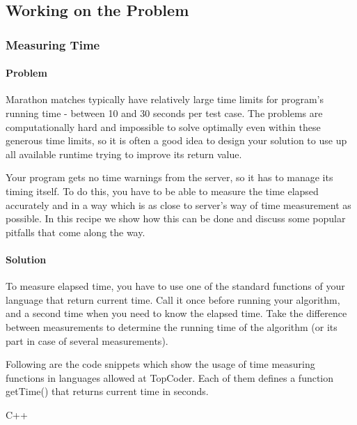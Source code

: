 \hypertarget{working-on-the-problem}{%
\subsection{Working on the Problem}\label{working-on-the-problem}}

\hypertarget{measuring-time}{%
\subsubsection{Measuring Time}\label{measuring-time}}

\hypertarget{problem}{%
\paragraph{Problem}\label{problem}}

Marathon matches typically have relatively large time limits for
program's running time - between 10 and 30 seconds per test case. The
problems are computationally hard and impossible to solve optimally even
within these generous time limits, so it is often a good idea to design
your solution to use up all available runtime trying to improve its
return value.

Your program gets no time warnings from the server, so it has to manage
its timing itself. To do this, you have to be able to measure the time
elapsed accurately and in a way which is as close to server's way of
time measurement as possible. In this recipe we show how this can be
done and discuss some popular pitfalls that come along the way.

\hypertarget{solution}{%
\paragraph{Solution}\label{solution}}

To measure elapsed time, you have to use one of the standard functions
of your language that return current time. Call it once before running
your algorithm, and a second time when you need to know the elapsed
time. Take the difference between measurements to determine the running
time of the algorithm (or its part in case of several measurements).

Following are the code snippets which show the usage of time measuring
functions in languages allowed at TopCoder. Each of them defines a
function getTime() that returns current time in seconds.

C++

\begin{Shaded}
\begin{Highlighting}[]


\NormalTok{);}
   \NormalTok{;}
\NormalTok{\}}
\end{Highlighting}
\end{Shaded}

